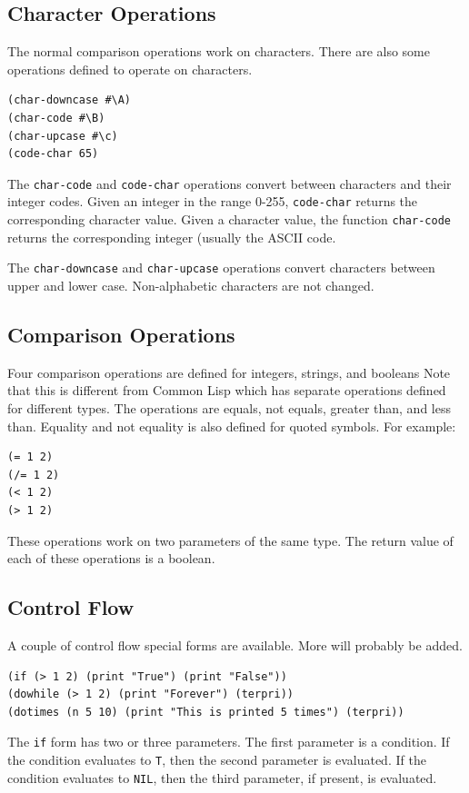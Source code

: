 \documentclass[10pt, openany]{book}
\newcommand{\function}[1]{\texttt{#1}}
\newcommand{\cl}{Common Lisp}
\begin{document}
\subsection{Character Operations}
The normal comparison operations work on characters.  There are also some operations defined to operate on characters.
\begin{lstlisting}
(char-downcase #\A)
(char-code #\B)
(char-upcase #\c)
(code-char 65)
\end{lstlisting}

The \function{char-code} and \function{code-char} operations convert between characters and their integer codes.  Given an integer in the range 0-255, \function{code-char} returns the corresponding character value.  Given a character value, the function \function{char-code} returns the corresponding integer (usually the ASCII code.

The \function{char-downcase} and \function{char-upcase} operations convert characters between upper and lower case.  Non-alphabetic characters are not changed.

\subsection{Comparison Operations}
Four comparison operations are defined for integers, strings, and booleans  Note that this is different from \cl{} which has separate operations defined for different types.  The operations are equals, not equals, greater than, and less than.  Equality and not equality is also defined for quoted symbols.  For example:

\begin{lstlisting}
(= 1 2)
(/= 1 2)
(< 1 2)
(> 1 2)
\end{lstlisting}
These operations work on two parameters of the same type.  The return value of each of these operations is a boolean.

\subsection{Control Flow}
A couple of control flow special forms are available.  More will probably be added.

\begin{lstlisting}
(if (> 1 2) (print "True") (print "False"))
(dowhile (> 1 2) (print "Forever") (terpri))
(dotimes (n 5 10) (print "This is printed 5 times") (terpri))
\end{lstlisting}

The \function{if} form has two or three parameters.  The first parameter is a condition.  If the condition evaluates to \function{T}, then the second parameter is evaluated.  If the condition evaluates to \function{NIL}, then the third parameter, if present, is evaluated.
\end{document}
